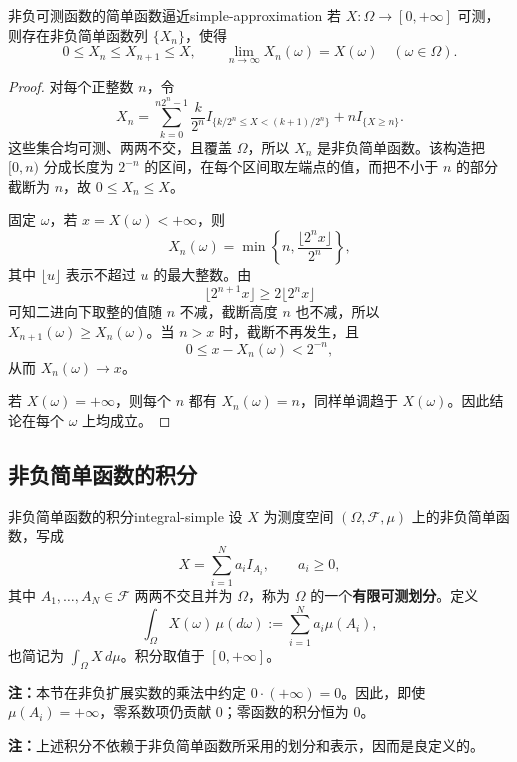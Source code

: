 \begin{mytheorem}{非负可测函数的简单函数逼近}{simple-approximation}
若 $X:\Omega\to[0,+\infty]$ 可测，则存在非负简单函数列 $\{X_n\}$，使得
\[
0\leq X_n\leq X_{n+1}\leq X,\qquad
\lim_{n\to\infty}X_n(\omega)=X(\omega)\quad(\omega\in\Omega).
\]
\end{mytheorem}

\begin{proof}
对每个正整数 $n$，令
\[
X_n=\sum_{k=0}^{n2^n-1}\frac{k}{2^n}
 I_{\{k/2^n\leq X<(k+1)/2^n\}}
 +nI_{\{X\geq n\}}.
\]
这些集合均可测、两两不交，且覆盖 $\Omega$，所以 $X_n$ 是非负简单函数。该构造把 $[0,n)$ 分成长度为 $2^{-n}$ 的区间，在每个区间取左端点的值，而把不小于 $n$ 的部分截断为 $n$，故 $0\leq X_n\leq X$。

固定 $\omega$，若 $x=X(\omega)<+\infty$，则
\[
X_n(\omega)=\min\left\{n,\frac{\lfloor2^n x\rfloor}{2^n}\right\},
\]
其中 $\lfloor u\rfloor$ 表示不超过 $u$ 的最大整数。由
\[
\lfloor2^{n+1}x\rfloor\geq2\lfloor2^n x\rfloor
\]
可知二进向下取整的值随 $n$ 不减，截断高度 $n$ 也不减，所以 $X_{n+1}(\omega)\geq X_n(\omega)$。当 $n>x$ 时，截断不再发生，且
\[
0\leq x-X_n(\omega)<2^{-n},
\]
从而 $X_n(\omega)\to x$。

若 $X(\omega)=+\infty$，则每个 $n$ 都有 $X_n(\omega)=n$，同样单调趋于 $X(\omega)$。因此结论在每个 $\omega$ 上均成立。
\end{proof}

\subsection*{非负简单函数的积分}

\begin{mydefinition}{非负简单函数的积分}{integral-simple}
设 $X$ 为测度空间 $(\Omega,\mathcal F,\mu)$ 上的非负简单函数，写成
\[
X=\sum_{i=1}^N a_i I_{A_i},\qquad a_i\geq0,
\]
其中 $A_1,\ldots,A_N\in\mathcal F$ 两两不交且并为 $\Omega$，称为 $\Omega$ 的一个\textbf{有限可测划分}。定义
\[
\int_\Omega X(\omega)\,\mu(d\omega)
:=\sum_{i=1}^N a_i\mu(A_i),
\]
也简记为 $\int_\Omega X\,d\mu$。积分取值于 $[0,+\infty]$。
\end{mydefinition}

\textbf{注：}\quad 本节在非负扩展实数的乘法中约定 $0\cdot(+\infty)=0$。因此，即使 $\mu(A_i)=+\infty$，零系数项仍贡献 $0$；零函数的积分恒为 $0$。

\textbf{注：}\quad 上述积分不依赖于非负简单函数所采用的划分和表示，因而是良定义的。


